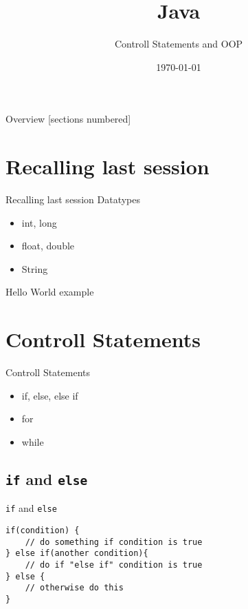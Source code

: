 


\title{Java}
\subtitle{Controll Statements and OOP}
\date{\today}

\def\code#1{\texttt{#1}}



\begin{frame}
    \titlepage
\end{frame}
\begin{frame}{Overview}
    [sections numbered]
    \tableofcontents
\end{frame}

\section{Recalling last session}
\begin{frame}{Recalling last session}
    Datatypes
    \begin{itemize}
        \item int, long
        \item float, double
        \item String
    \end{itemize}
    Hello World example
\end{frame}

\section{Controll Statements}
\begin{frame}{Controll Statements}
    
    \begin{itemize}
        \item if, else, else if
        \item for
        \item while
    \end{itemize}
        
\end{frame}

\subsection{\code{if} and \code{else}}
\begin{frame}[fragile]{\code{if} and \code{else}}
\begin{lstlisting}
if(condition) {
    // do something if condition is true
} else if(another condition){
    // do if "else if" condition is true 
} else {
    // otherwise do this
}\end{lstlisting}
\end{frame}

